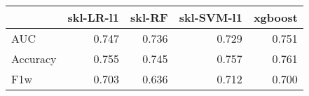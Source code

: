 \begin{tabular}{lrrrr}
\toprule
{} &  skl-LR-l1 &  skl-RF &  skl-SVM-l1 &  xgboost \\
\midrule
AUC      &      0.747 &   0.736 &       0.729 &    0.751 \\
Accuracy &      0.755 &   0.745 &       0.757 &    0.761 \\
F1w      &      0.703 &   0.636 &       0.712 &    0.700 \\
\bottomrule
\end{tabular}
